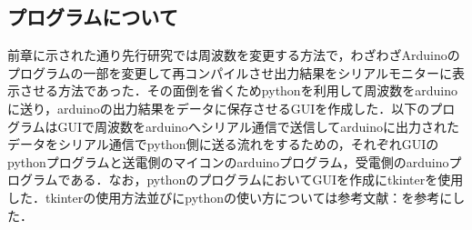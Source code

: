 \documentclass[12pt]{jarticle}
\begin{document}
\subsection{プログラムについて}
前章に示された通り先行研究では周波数を変更する方法で，わざわざArduinoのプログラムの一部を変更して再コンパイルさせ出力結果をシリアルモニターに表示させる方法であった．その面倒を省くためpythonを利用して周波数をarduinoに送り，arduinoの出力結果をデータに保存させるGUIを作成した．以下のプログラムはGUIで周波数をarduinoへシリアル通信で送信してarduinoに出力されたデータをシリアル通信でpython側に送る流れをするための，それぞれGUIのpythonプログラムと送電側のマイコンのarduinoプログラム，受電側のarduinoプログラムである．なお，pythonのプログラムにおいてGUIを作成にtkinterを使用した．tkinterの使用方法並びにpythonの使い方については参考文献：\cite{tkinter}を参考にした．
	
\end{document}
